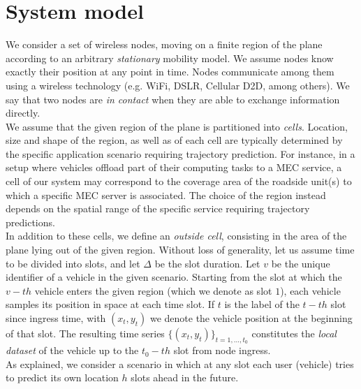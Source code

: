 \documentclass[conference]{IEEEtran}
\begin{document}
\section{System model}
\label{sec:System model}
We consider a set of wireless nodes, moving on a finite region of the plane according to an arbitrary \textit{stationary} mobility model. We assume nodes know exactly their position at any point in time. Nodes communicate among them using a wireless technology (e.g. WiFi, DSLR, Cellular D2D, among others). We say that two nodes are \textit{in contact} when they are able to exchange information directly.\\
We assume that the given region of the plane is partitioned into \textit{cells}. Location, size and shape of the region, as well as of each cell are typically determined by the specific application scenario requiring trajectory prediction. For instance, in a setup where vehicles offload part of their computing tasks to a MEC service, a cell of our system may correspond to the coverage area of the roadside unit(s) to which a specific MEC server is associated. The choice of the region instead depends on the spatial range of the specific service requiring trajectory predictions.\\
In addition to these cells, we define an \textit{outside cell}, consisting in the area of the plane lying out of the given region. 
Without loss of generality, let us assume time to be divided into slots, and let $\Delta$ be the slot duration.
Let $v$ be the unique identifier of a vehicle in the given scenario. Starting from the slot at which the $v-th$ vehicle enters the given region (which we denote as slot $1$),  each vehicle samples its position in space at each time slot. If $t$ is the label of the $t-th$ slot since ingress time, with $(x_t,y_t)$ we denote the vehicle position at the beginning of that slot. The resulting time series $\{( x_t,y_t)\}_{t=1,...,t_0}$
constitutes the \textit{local dataset} of the vehicle up to the $t_0-th$ slot from node ingress.\\
As explained, we consider a scenario in which at any slot each user (vehicle) tries to predict its own location $h$ slots ahead in the future. %
\end{document}
